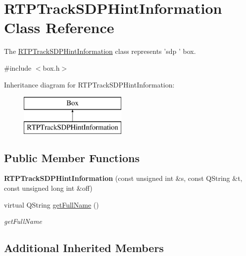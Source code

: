 \hypertarget{class_r_t_p_track_s_d_p_hint_information}{\section{R\-T\-P\-Track\-S\-D\-P\-Hint\-Information Class Reference}
\label{class_r_t_p_track_s_d_p_hint_information}
}


The \hyperlink{class_r_t_p_track_s_d_p_hint_information}{R\-T\-P\-Track\-S\-D\-P\-Hint\-Information} class represents 'sdp ' box.  




{\ttfamily \#include $<$box.\-h$>$}

Inheritance diagram for R\-T\-P\-Track\-S\-D\-P\-Hint\-Information\-:\begin{figure}[H]
\begin{center}
\leavevmode
\includegraphics[height=2.000000cm]{class_r_t_p_track_s_d_p_hint_information}
\end{center}
\end{figure}
\subsection*{Public Member Functions}
\begin{DoxyCompactItemize}
\item 
\hypertarget{class_r_t_p_track_s_d_p_hint_information_a77f7a50365f9a5107c3ccbed0f4d4986}{{\bfseries R\-T\-P\-Track\-S\-D\-P\-Hint\-Information} (const unsigned int \&s, const Q\-String \&t, const unsigned long int \&off)}\label{class_r_t_p_track_s_d_p_hint_information_a77f7a50365f9a5107c3ccbed0f4d4986}

\item 
virtual Q\-String \hyperlink{class_r_t_p_track_s_d_p_hint_information_a4603595aa6393c8c9291e43d869c0313}{get\-Full\-Name} ()
\begin{DoxyCompactList}\small\item\em get\-Full\-Name \end{DoxyCompactList}\end{DoxyCompactItemize}
\subsection*{Additional Inherited Members}



